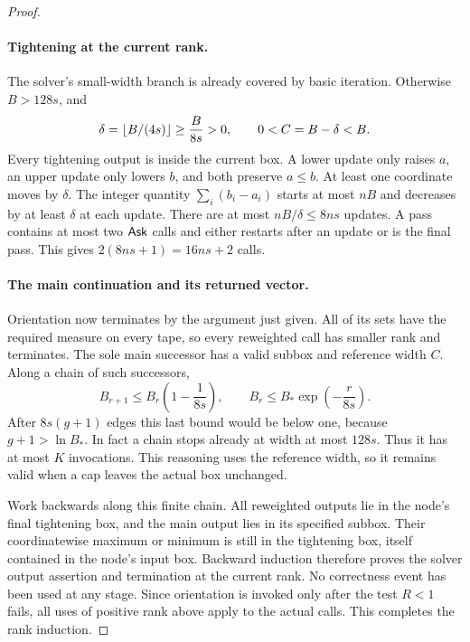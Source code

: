 \begin{proof}
\paragraph{Tightening at the current rank.}
The solver's small-width branch is already covered by basic iteration.
Otherwise $B>128s$, and
\begin{equation}\label{alg:delta-bound}
 \delta=\lfloor B/(4s)\rfloor\ge\frac{B}{8s}>0,
 \qquad0<C=B-\delta<B.
\end{equation}
Every tightening output is inside the current box. A lower update only
raises $a$, an upper update only lowers $b$, and both preserve $a\le b$.
At least one coordinate moves by $\delta$. The integer quantity
$\sum_i(b_i-a_i)$ starts at most $nB$ and decreases by at least
$\delta$ at each update. There are at most $nB/\delta\le8ns$ updates.
A pass contains at most two $\mathsf{Ask}$ calls and either restarts after an
update or is the final pass. This gives $2(8ns+1)=16ns+2$ calls.

\paragraph{The main continuation and its returned vector.}
Orientation now terminates by the argument just given. All of its sets
have the required measure on every tape, so every reweighted call has
smaller rank and terminates. The sole main successor has a valid subbox
and reference width $C$. Along a chain of such successors,
\[
 B_{r+1}\le B_r\left(1-\frac1{8s}\right),\qquad
 B_r\le B_*\exp\left(-\frac r{8s}\right).
\]
After $8s(g+1)$ edges this last bound would be below one, because
$g+1>\ln B_*$. In fact a chain stops already at width at most $128s$.
Thus it has at most $K$ invocations. This reasoning uses the reference
width, so it remains valid when a cap leaves the actual box unchanged.

Work backwards along this finite chain. All reweighted outputs lie in
the node's final tightening box, and the main output lies in its
specified subbox. Their coordinatewise maximum or minimum is still in
the tightening box, itself contained in the node's input box. Backward
induction therefore proves the solver output assertion and termination
at the current rank. No correctness event has been used at any stage.
Since orientation is invoked only after the test $R<1$ fails, all uses
of positive rank above apply to the actual calls. This completes the
rank induction.
\end{proof}
